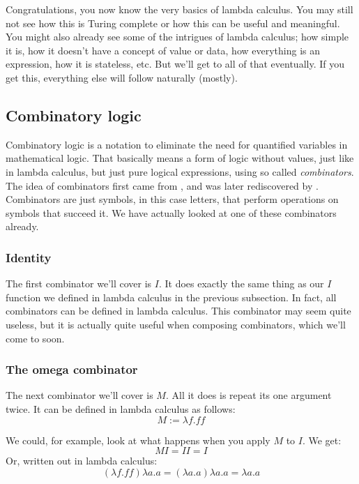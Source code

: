 \documentclass[a4paper]{article}
\begin{document}
Congratulations, you now know the very basics of lambda calculus. You may still
not see how this is Turing complete or how this can be useful and meaningful.
You might also already see some of the intrigues of lambda calculus; how simple
it is, how it doesn't have a concept of value or data, how everything is an
expression, how it is stateless, etc. But we'll get to all of that eventually.
If you get this, everything else will follow naturally (mostly).

\subsection{Combinatory logic}


Combinatory logic is a notation to eliminate the need for quantified variables
in mathematical logic. That basically means a form of logic without values,
just like in lambda calculus, but just pure logical expressions, using so
called \emph{combinators}. The idea of combinators first came from
\textcite{schonfinkel1924}, and was later rediscovered by \textcite{curry1930}.
Combinators are just symbols, in this case letters, that perform operations on
symbols that succeed it. We have actually looked at one of these combinators
already.

\subsubsection{Identity}

The first combinator we'll cover is \(I\). It does exactly the same thing as
our \(I\) function we defined in lambda calculus in the previous subsection.
In fact, all combinators can be defined in lambda calculus. This combinator may
seem quite useless, but it is actually quite useful when composing combinators,
which we'll come to soon.

\subsubsection{The omega combinator}

The next combinator we'll cover is \(M\). All it does is repeat its one
argument twice. It can be defined in lambda calculus as follows:
\[M:=\lambda f.ff\]

We could, for example, look at what happens when you apply \(M\) to \(I\). We
get:
\[M I = I I = I\]
Or, written out in lambda calculus:
\[(\lambda f.ff)\lambda a.a=(\lambda a.a)\lambda a.a=\lambda a.a\]
\end{document}
